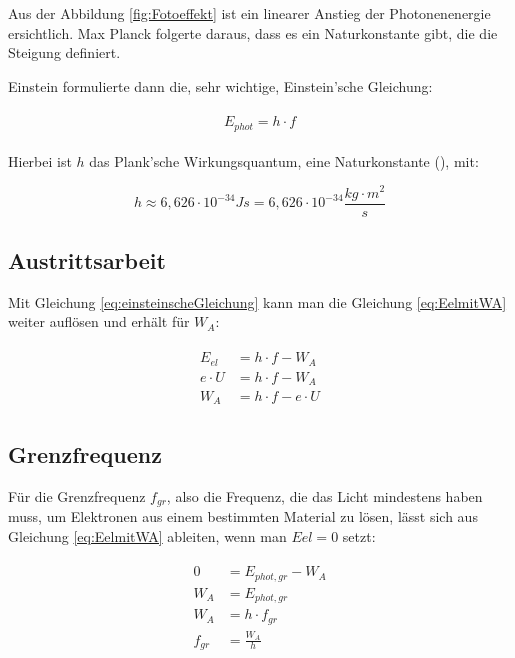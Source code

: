Aus der Abbildung \ref{fig:Fotoeffekt} ist ein linearer Anstieg der Photonenenergie ersichtlich. Max Planck folgerte daraus, dass es ein Naturkonstante gibt, die die Steigung definiert.

Einstein formulierte dann die, sehr wichtige, Einstein'sche Gleichung:

\begin{align}	\label{eq:einsteinscheGleichung}
\begin{split}
	E_{phot} = h \cdot f
\end{split}
\end{align}

\noindent Hierbei ist $h$ das \glqq Plank'sche Wirkungsquantum\grqq , eine Naturkonstante (), mit:

\begin{equation}
	h \approx 6,626 \cdot 10^{-34} Js = 6,626 \cdot 10^{-34} \frac{kg \cdot m^2}{s}
\end{equation}


\subsection{Austrittsarbeit}

Mit Gleichung \ref{eq:einsteinscheGleichung} kann man die Gleichung \ref{eq:EelmitWA} weiter auflösen und erhält für $W_A$:

\begin{align} \label{eq:Austrittsarbeit}
\begin{split}
	E_{el} &= h \cdot f - W_A \\
	e \cdot U &= h \cdot f - W_A \\
	W_A &= h \cdot f - e \cdot U
\end{split}
\end{align}


\subsection{Grenzfrequenz}

Für die Grenzfrequenz $f_{gr}$, also die Frequenz, die das Licht mindestens haben muss, um Elektronen aus einem bestimmten Material zu lösen, lässt sich aus Gleichung \ref{eq:EelmitWA} ableiten, wenn man $E{el} = 0$ setzt:

\begin{align} \label{eq:Grenzfrequenz}
\begin{split}
	0 &= E_{phot,gr} - W_A \\
	W_A &= E_{phot,gr} \\
	W_A &= h \cdot f_{gr} \\
	f_{gr} &= \frac{W_A}{h}
\end{split}
\end{align}


